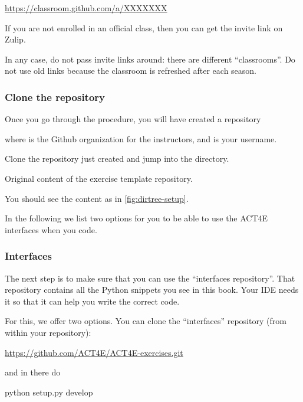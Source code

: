 \url{https://classroom.github.com/a/XXXXXXX}

If you are not enrolled in an official class, then you can get the invite link on Zulip.

In any case, do not pass invite links around: there are different ``classrooms''.
Do not use old links because the classroom is refreshed after each season.

\subsubsection{Clone the repository}

Once you go through the procedure, you will have created a repository

\begin{quote}
\end{quote}
where  is the Github organization for the instructors, and  is your username.

Clone the repository just created and jump into the directory.

\begin{marginfigure}
    \caption{Original content of the exercise template repository.}
    \label{fig:dirtree-setup}
\end{marginfigure}

You should see the content as in \cref{fig:dirtree-setup}.

In the following we list two options for you to be able to use the ACT4E interfaces when you code.

\subsubsection{Interfaces}

The next step is to make sure that you can use the ``interfaces repository''.
That repository contains all the Python snippets you see in this book.
Your IDE needs it so that it can help you write the correct code.

For this, we offer two options.
You can clone the ``interfaces'' repository (from within your repository):

\url{https://github.com/ACT4E/ACT4E-exercises.git}

and in there do

\begin{console}
    python setup.py develop
\end{console}

